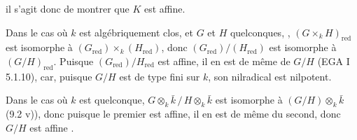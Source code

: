 \documentclass[11pt,a4paper]{article}
\begin{document}

il s'agit donc de montrer que $K$ est affine.

 

Dans le cas où $k$ est algébriquement clos, et $G$ et $H$ quelconques,
\struck{\ill{}}, $(G \times_{k} H)_{\mathrm{red}}$ est isomorphe à
$(G_{\mathrm{red}}) \times_{k} (H_{\mathrm{red}})$, donc
$(G_{\mathrm{red}})/(H_{\mathrm{red}})$ est isomorphe à
$(G/H)_{\mathrm{red}}$. Puisque $(G_{\mathrm{red}})/H_{\mathrm{red}}$ est
affine, il en est de même de $G/H$ (EGA I 5.1.10), car, puisque $G/H$ est
de type fini sur $k$, son nilradical est nilpotent.

Dans le cas où $k$ est quelconque,
$G \otimes_{k} \bar{k} \,/\, H \otimes_{k} \bar{k}$ est isomorphe à
$(G/H) \otimes_{k} \bar{k}$ (9.2 v)), donc puisque le premier est affine,
il en est de même du second, donc $G/H$ est affine .
\end{document}
